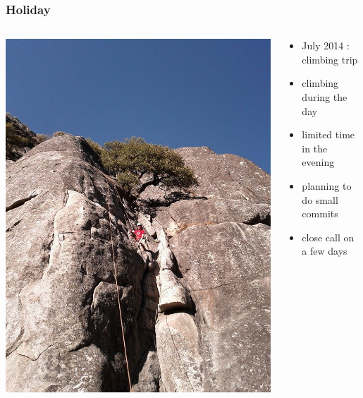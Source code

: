 \documentclass[14pt]{beamer}
\begin{document}
  \begin{frame}
    \frametitle{Holiday}
    \begin{columns}
      \begin{column}{0.5\textwidth}
        \includegraphics[scale=.25]{climbing.jpg}
      \end{column}
      \begin{column}{0.5\textwidth}
        \begin{itemize}
          \item July 2014 : climbing trip
          \item climbing during the day
          \item limited time in the evening
          \item planning to do small commits
          \item close call on a few days
        \end{itemize}
      \end{column}
    \end{columns}
  \end{frame}
\end{document}

